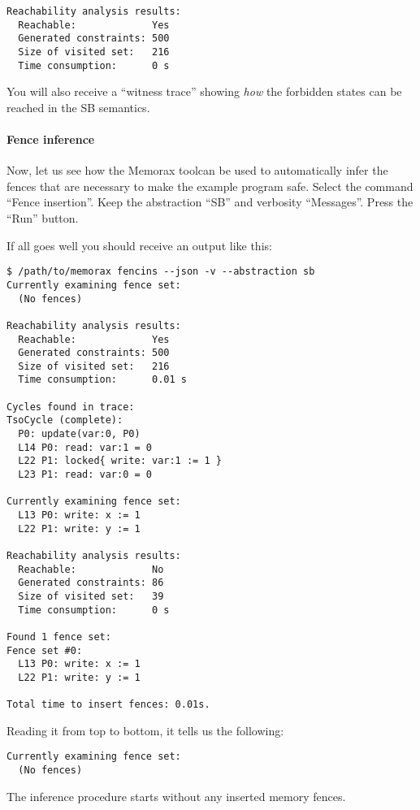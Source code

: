 \documentclass[a4paper]{article}
\newcommand{\thetool}{the Memorax tool} %
\begin{document}
\noindent
\begin{verbatim}
Reachability analysis results:
  Reachable:             Yes
  Generated constraints: 500
  Size of visited set:   216
  Time consumption:      0 s
\end{verbatim}

You will also receive a ``witness trace'' showing \emph{how} the
forbidden states can be reached in the SB semantics.

\paragraph{Fence inference}
Now, let us see how \thetool can be used to automatically infer the
fences that are necessary to make the example program safe. Select the
command ``Fence insertion''. Keep the abstraction ``SB'' and verbosity
``Messages''. Press the ``Run'' button. 

If all goes well you should receive an output like this:

\noindent
\begin{verbatim}
$ /path/to/memorax fencins --json -v --abstraction sb
Currently examining fence set:
  (No fences)

Reachability analysis results:
  Reachable:             Yes
  Generated constraints: 500
  Size of visited set:   216
  Time consumption:      0.01 s

Cycles found in trace:
TsoCycle (complete):
  P0: update(var:0, P0)
  L14 P0: read: var:1 = 0
  L22 P1: locked{ write: var:1 := 1 }
  L23 P1: read: var:0 = 0

Currently examining fence set:
  L13 P0: write: x := 1
  L22 P1: write: y := 1

Reachability analysis results:
  Reachable:             No
  Generated constraints: 86
  Size of visited set:   39
  Time consumption:      0 s

Found 1 fence set:
Fence set #0:
  L13 P0: write: x := 1
  L22 P1: write: y := 1

Total time to insert fences: 0.01s.
\end{verbatim}

Reading it from top to bottom, it tells us the following:

\noindent
\begin{verbatim}
Currently examining fence set:
  (No fences)
\end{verbatim}

The inference procedure starts without any inserted memory fences.
\end{document}

